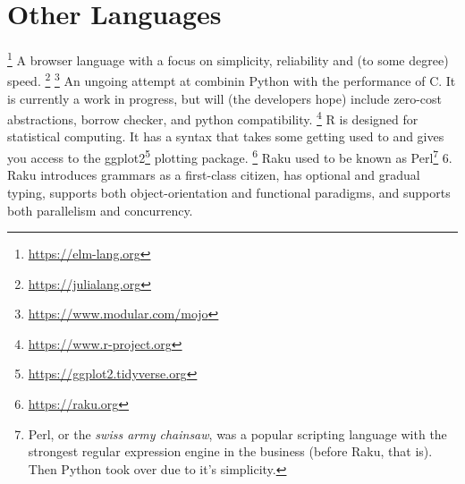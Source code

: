 \section{Other Languages}

\begin{itemize}
  \footnote{\url{https://elm-lang.org}} A  browser language with a focus on simplicity, reliability and (to some degree) speed.
  \footnote{\url{https://julialang.org}}
  \footnote{\url{https://www.modular.com/mojo}} An ungoing attempt at combinin Python with the performance of C. It is currently a work in progress, but will (the developers hope) include zero-cost abstractions, borrow checker, and python compatibility.
  \footnote{\url{https://www.r-project.org}} R is designed for statistical computing. It has a syntax that takes some getting used to and gives you access to the ggplot2\footnote{\url{https://ggplot2.tidyverse.org}} plotting package.
  \footnote{\url{https://raku.org}} Raku used to be known as Perl\footnote{Perl, or the \textsl{swiss army chainsaw}, was a popular scripting language with the strongest regular expression engine in the business (before Raku, that is). Then Python took over due to it's simplicity.} 6. Raku introduces grammars as a first-class citizen, has optional and gradual typing, supports both object-orientation and functional paradigms, and supports both parallelism and concurrency.
\end{itemize}

